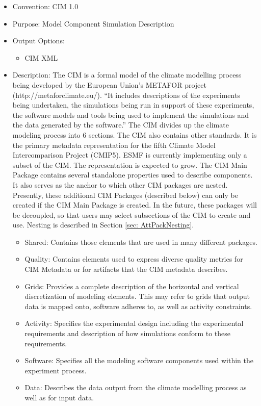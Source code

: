\begin{itemize}
    \item Convention: CIM 1.0
    \item Purpose: Model Component Simulation Description
    \item Output Options: 
    \begin{itemize}
        \item CIM XML
    \end{itemize}  
    \item Description: The CIM is a formal model of the climate modelling process being developed by the European Union's METAFOR project (http://metaforclimate.eu/). ``It includes descriptions of the experiments being undertaken, the simulations being run in support of these experiments, the software models and tools being used to implement the simulations and the data generated by the software.'' The CIM divides up the climate modeling process into 6 sections. The CIM also contains other standards. It is the primary metadata representation for the fifth Climate Model Intercomparison Project (CMIP5). ESMF is currently implementing only a subset of the CIM. The representation is expected to grow. The CIM Main Package contains several standalone properties used to describe components. It also serves as the anchor to which other CIM packages are nested. Presently, these additional CIM Packages (described below) can only be created if the CIM Main Package is created. In the future, these packages will be decoupled, so that users may select subsections of the CIM to create and use. Nesting is described in Section \ref{sec: AttPackNesting}. 
    \begin{itemize}
       \item Shared: Contains those elements that are used in many different packages. 
       \item Quality: Contains elements used to express diverse quality metrics for CIM Metadata or for artifacts that the CIM metadata describes.
       \item Grids: Provides a complete description of the horizontal and vertical discretization of modeling elements. This may refer to grids that output data is mapped onto, software adheres to, as well as activity constraints. 
       \item Activity: Specifies the experimental design including the experimental requirements and description of how simulations conform to these requirements.
       \item Software: Specifies all the modeling software components used within the experiment process. 
       \item Data: Describes the data output from the climate modelling process as well as for input data. 
    \end{itemize}
\end{itemize}

